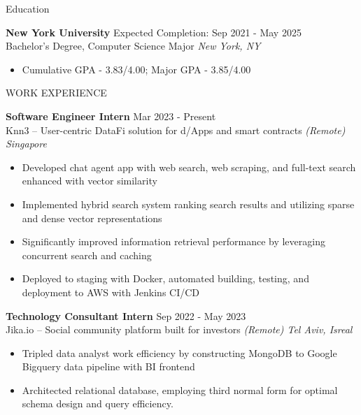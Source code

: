 \documentclass{resume} %
\begin{document}

\begin{rSection}{Education}

	\textbf{New York University} \hfill Expected Completion: Sep 2021 - May 2025\\
	Bachelor's Degree, Computer Science Major \hfill \textit{New York, NY}
	\begin{itemize}
		\item Cumulative GPA - 3.83/4.00; Major GPA - 3.85/4.00
	\end{itemize}

\end{rSection}


\begin{rSection}{WORK EXPERIENCE}

	\textbf{Software Engineer Intern} \hfill Mar 2023 - Present\\
	Knn3 – User-centric DataFi solution for d/Apps and smart contracts  \hfill \textit{(Remote) Singapore}
	\begin{itemize}
		\item Developed chat agent app with web search, web scraping, and full-text search enhanced with vector similarity
		\item Implemented hybrid search system ranking search results and utilizing sparse and dense vector representations
		\item Significantly improved information retrieval performance by leveraging concurrent search and caching
		\item Deployed to staging with Docker, automated building, testing, and deployment to AWS with Jenkins CI/CD
	\end{itemize}

	\textbf{Technology Consultant Intern} \hfill Sep 2022 - May 2023\\
	Jika.io – Social community platform built for investors \hfill \textit{(Remote) Tel Aviv, Isreal}
	\begin{itemize}
		\item Tripled data analyst work efficiency by constructing MongoDB to Google Bigquery data pipeline with BI frontend
		\item Architected relational database, employing third normal form for optimal schema design and query efficiency.
	\end{itemize}

\end{rSection}
\end{document}
